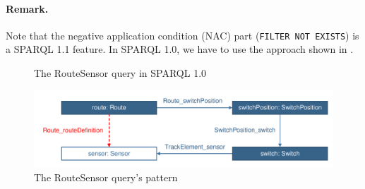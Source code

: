 \paragraph{Remark.} Note that the negative application condition (NAC) part (\texttt{FILTER NOT EXISTS}) is a SPARQL 1.1 feature. In SPARQL 1.0, we have to use the approach shown in .

\begin{figure}[Htb]
\centering
\begin{minipage}{0.6\textwidth}
  { \alignListing
    }
  \caption{The \textsf{RouteSensor} query in SPARQL 1.0}
  \label{lst:routesensor-sparql-nac10}
\end{minipage}
\end{figure}

% 
% 
% 

\begin{figure}[Htb]
		\centering
		\includegraphics[scale=0.4]{figures/trainbenchmark-routesensor}
		\caption{The \textsf{RouteSensor} query's pattern}
		\label{fig:trainbenchmark-routesensor}
\end{figure}

